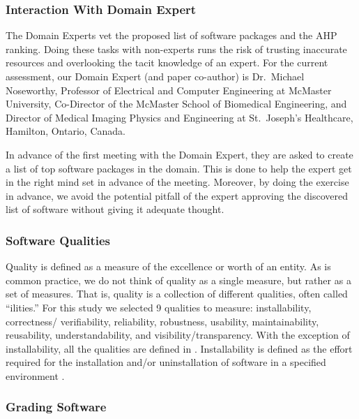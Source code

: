 \documentclass[11pt]{article}
\begin{document}
\subsubsection{Interaction With Domain Expert} \label{sec_vet_software_list}

The Domain Experts vet the proposed list of software packages and the AHP
ranking.  Doing these tasks with non-experts runs the risk of trusting
inaccurate resources and overlooking the tacit knowledge of an expert. For the
current assessment, our Domain Expert (and paper co-author) is Dr.\ Michael
Noseworthy, Professor of Electrical and Computer Engineering at McMaster
University, Co-Director of the McMaster School of Biomedical Engineering, and
Director of Medical Imaging Physics and Engineering at St.\ Joseph's Healthcare,
Hamilton, Ontario, Canada.  

In advance of the first meeting with the Domain Expert, they are asked to
create a list of top software packages in the domain.  This is done to help
the expert get in the right mind set in advance of the meeting.  Moreover,
by doing the exercise in advance, we avoid the potential pitfall of the expert
approving the discovered list of software without giving it adequate thought.

\subsubsection{Software Qualities} \label{sec_software_quality}

Quality is defined as a measure of the excellence or worth of an entity.  As is
common practice, we do not think of quality as a single measure, but rather as a
set of measures.  That is, quality is a collection of different qualities, often
called ``ilities.''  For this study we selected 9 qualities to measure:
installability, correctness/ verifiability, reliability, robustness, usability,
maintainability, reusability, understandability, and visibility/transparency.
With the exception of installability, all the qualities are defined in
\citet{GhezziEtAl2003}. Installability is defined as the effort required for the
installation and/or uninstallation of software in a specified environment
\citep{ISO/IEC25010, lenhard2013measuring}.

\subsubsection{Grading Software} \label{sec_grading_software}
\end{document}
